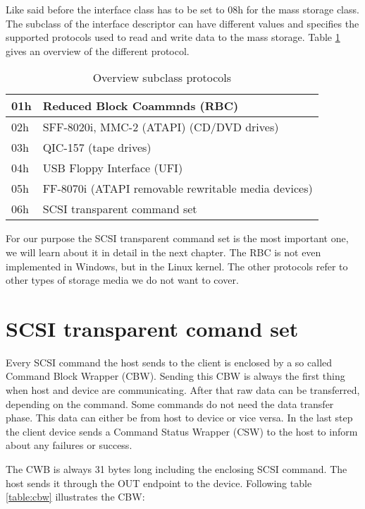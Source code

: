Like said before the interface class has to be set to 08h for the mass storage class. The subclass of the interface descriptor can have different values and specifies the supported protocols used to read and write data to the mass storage. Table \ref{table:subclass} gives an overview of the different protocol.

\begin{table}[ht]
\caption{Overview subclass protocols \cite{usb_ms_jan}}
\centering
\begin{tabular}{|l|l|}
\hline\hline
01h & Reduced Block Coammnds (RBC) \\ \hline
02h & SFF-8020i, MMC-2 (ATAPI) (CD/DVD drives) \\ \hline
03h & QIC-157 (tape drives) \\ \hline
04h & USB Floppy Interface (UFI) \\ \hline
05h & FF-8070i (ATAPI removable rewritable media devices) \\ \hline
06h & SCSI transparent command set \\ \hline
\end{tabular}
\label{table:subclass}
\end{table}

For our purpose the SCSI transparent command set is the most important one, we will learn about it in detail in the next chapter. The RBC is not even implemented in Windows, but in the Linux kernel. The other protocols refer to other types of storage media we do not want to cover.

\section{SCSI transparent comand set}

Every SCSI command the host sends to the client is enclosed by a so called Command Block Wrapper (CBW). Sending this CBW is always the first thing when host and device are communicating. After that raw data can be transferred, depending on the command. Some commands do not need the data transfer phase. This data can either be from host to device or vice versa. In the last step the client device sends a Command Status Wrapper (CSW) to the host to inform about any failures or success.

The CWB is always 31 bytes long including the enclosing SCSI command. The host sends it through the OUT endpoint to the device. Following table \ref{table:cbw} illustrates the CBW:

